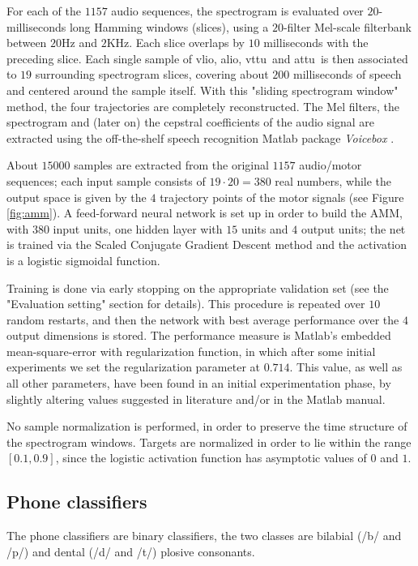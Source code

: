 \documentclass[10pt]{article}
\newcommand{\vlio}{\textsf{vlio}}
\newcommand{\vttu}{\textsf{vttu}}
\newcommand{\alio}{\textsf{alio}}
\newcommand{\attu}{\textsf{attu}}
\begin{document}
For each of the $1157$ audio sequences, the spectrogram is evaluated
over $20$-milliseconds long Hamming windows (slices), using a $20$-filter
Mel-scale filterbank between $20$Hz and $2$KHz. Each slice overlaps by $10$ milliseconds with
the preceding slice. Each single sample of \vlio, \alio, \vttu\ and \attu\ is
then associated to $19$ surrounding spectrogram slices, covering
about $200$ milliseconds of speech and centered around the sample itself. With this
"sliding spectrogram window" method, the four trajectories are completely reconstructed.
The Mel filters, the spectrogram and (later on) the cepstral coefficients of the audio
signal are extracted using the off-the-shelf speech recognition Matlab package
\emph{Voicebox} \cite{Brookes1997}.

About $15000$ samples are extracted from the original $1157$
audio/motor sequences; each input sample consists of $19\cdot 20 = 380$ real
numbers, while the output space is given by the $4$ trajectory points of
the motor signals (see Figure \ref{fig:amm}).
A feed-forward neural network is set up in order to
build the AMM, with $380$ input units, one hidden layer with $15$ units and
$4$ output units; the net is trained via the Scaled Conjugate Gradient
Descent method \cite{MOLLER93} and the activation is a logistic sigmoidal function.

Training is done via early stopping on the appropriate validation set (see the "Evaluation setting"
section for details). This procedure is repeated over $10$ random restarts, and then
the network with best average performance over the $4$ output dimensions is stored.
The performance measure is Matlab's embedded mean-square-error with regularization
function, in which after some initial experiments we set the regularization
parameter at $0.714$. This value, as well as all other parameters, have been found in
an initial experimentation phase, by slightly altering values suggested in literature
and/or in the Matlab manual.

No sample normalization is performed, in order to preserve the time structure of the
spectrogram windows. Targets are normalized in order to lie within the range $[0.1,0.9]$,
since the logistic activation function has asymptotic values of $0$ and $1$.


\subsection*{Phone classifiers}
\label{subsec:featset}
The phone classifiers are binary classifiers, the two classes are bilabial (/b/ and /p/) and dental (/d/ and /t/) plosive consonants.
\end{document}

